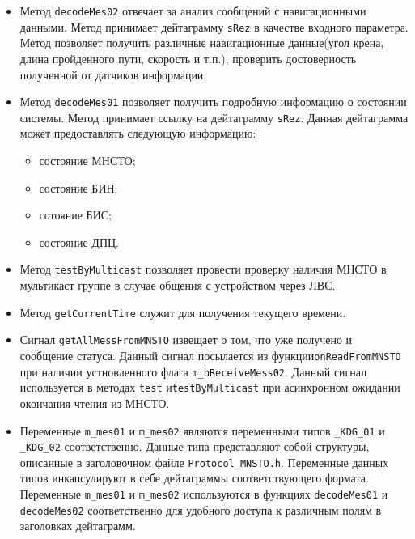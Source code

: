 \begin{itemize}
	\item Метод \texttt{decodeMes02} отвечает за анализ сообщений с навигационными данными. Метод принимает
		дейтаграмму \texttt{sRez} в качестве входного параметра. Метод позволяет получить
		различные навигационные данные(угол крена, длина пройденного пути, скорость и т.п.),
		проверить достоверность полученной от датчиков информации.

	\item Метод \texttt{decodeMes01} позволяет получить подробную информацию о состоянии системы. Метод принимает
		ссылку на дейтаграмму \texttt{sRez}. Данная
		дейтаграмма может предоставлять следующую информацию:
		\begin{itemize}
				\item состояние МНСТО;
				\item состояние БИН;
				\item сотояние БИС;
				\item состояние ДПЦ.
		\end{itemize}

	\item Метод \texttt{testByMulticast} позволяет провести проверку наличия МНСТО в мультикаст группе в случае
		общения с устройством через ЛВС.

	\item Метод \texttt{getCurrentTime} служит для получения текущего времени.

	\item Сигнал \texttt{getAllMessFromMNSTO} извещает о том, что уже получено и сообщение статуса. Данный сигнал
		посылается из функции\break \texttt{onReadFromMNSTO} при наличии
		устновленного флага\break
		\texttt{m\_bReceiveMess02}. Данный сигнал используется в методах
		\texttt{test} и\break \texttt{testByMulticast} при асинхронном ожидании окончания чтения из МНСТО.

	\item Переменные \texttt{m\_mes01} и \texttt{m\_mes02} являются переменными типов \texttt{\_KDG\_01} и
		\texttt{\_KDG\_02} соответственно. Данные типа представляют собой структуры, описанные в заголовочном
		файле \texttt{Protocol\_MNSTO.h}. Переменные данных типов инкапсулируют в себе дейтаграммы
		соответствующего формата. Переменные \texttt{m\_mes01} и \texttt{m\_mes02} используются в функциях
		\texttt{decodeMes01} и \texttt{decodeMes02} соответственно для удобного доступа к различным полям в
		заголовках дейтаграмм.
\end{itemize}

